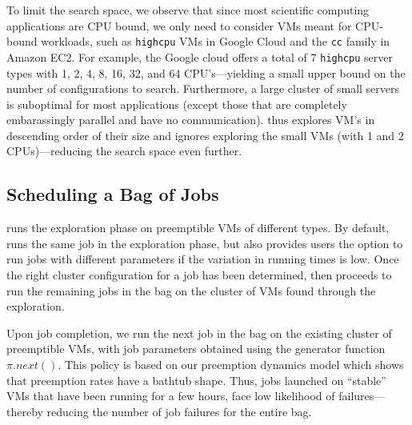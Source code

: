 
To limit the search space, we observe that since most scientific computing applications are CPU bound, we only need to consider VMs meant for CPU-bound workloads, such as \texttt{highcpu} VMs in Google Cloud and the \texttt{cc} family in Amazon EC2.
For example, the Google cloud offers a total of 7 \texttt{highcpu} server types with 1, 2, 4, 8, 16, 32, and 64 CPU's---yielding a small upper bound on the number of configurations to search. 
Furthermore, a large cluster of small servers is suboptimal for most applications (except those that are completely embarassingly parallel and have no communication).
\sysname thus explores VM's in descending order of their size and ignores exploring the small VMs (with 1 and 2 CPUs)---reducing the search space even further. 


\vspace*{\subsecspace}
\subsection{Scheduling a Bag of Jobs}

\sysname runs the exploration phase on preemptible VMs of different types. 
By default, \sysname runs the same job in the exploration phase, but also provides users the option to run jobs with different parameters if the variation in running times is low.
Once the right cluster configuration for a job has been determined, \sysname then proceeds to run the remaining jobs in the bag on the cluster of VMs found through the exploration.


Upon job completion, we run the next job in the bag on the existing cluster of preemptible VMs, with job parameters obtained using the generator function $\pi.next()$. 
This policy is based on our preemption dynamics model which shows that preemption rates have a bathtub shape.
Thus, jobs launched on ``stable'' VMs that have been running for a few hours, face low likelihood of failures---thereby reducing the number of job failures for the entire bag. 

